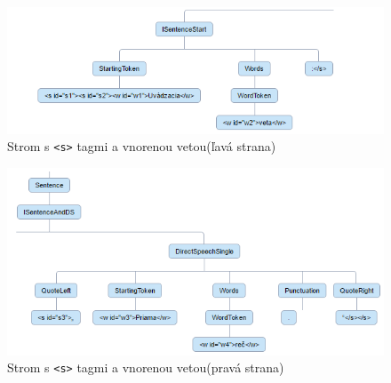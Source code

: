 \documentclass[12pt,a4paper]{report}
\theoremstyle{definition}
\theoremstyle{remark}
\begin{document}
\begin{figure}[H]
\centering
\includegraphics[scale=2.8]{sentenceTagsAndNestedSentenceLeft}
\caption{Strom s \texttt{<s>}  tagmi a vnorenou vetou(ľavá strana)}
\end{figure}
\begin{figure}[H]
\centering
\includegraphics[scale=2.6]{sentenceTagsAndNestedSentenceRight}
\caption{Strom s \texttt{<s>}  tagmi a vnorenou vetou(pravá strana)}
\end{figure}
\end{document}
